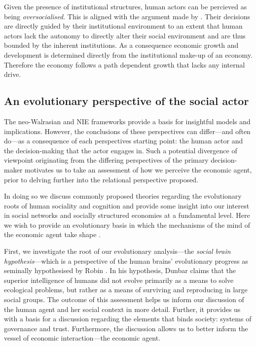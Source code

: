 

Given the presence of institutional structures, human actors can be percieved as being \emph{oversocialised}. This is aligned with the argument made by \cite{Grannovetter1985}. Their decisions are directly guided by their institutional environment to an extent that human actors lack the autonomy to directly alter their social environment and are thus bounded by the inherent institutions. As a consequence economic growth and development is determined directly from the institutional make-up of an economy. Therefore the economy follows a path dependent growth that lacks any internal drive.

\subsection{An evolutionary perspective of the social actor}

The neo-Walrasian and NIE frameworks provide a basis for insightful models and implications. However, the conclusions of these perspectives can differ---and often do---as a consequence of each perspectives starting point: the human actor and the decision-making that the actor engages in. Such a potential divergence of viewpoint originating from the differing perspectives of the primary decision-maker motivates us to take an assessment of how we perceive the economic agent, prior to delving further into the relational perspective proposed.

In doing so we discuss commonly proposed theories regarding the evolutionary roots of human sociality and cognition and provide some insight into our interest in social networks and socially structured economies at a fundamental level. Here we wish to provide an evolutionary basis in which the mechanisms of the mind of the economic agent take shape \citep{Pinker1997}. 

First, we investigate the root of our evolutionary analysis---the \emph{social brain hypothesis}---which is a perspective of the human brains' evolutionary progress as seminally hypothesised by Robin \citet{Dunbar1998}. In his hypothesis, Dunbar claims that the superior intelligence of humans did not evolve primarily as a means to solve ecological problems, but rather as a means of surviving and reproducing in large social groups. The outcome of this assessment helps us inform our discussion of the human agent and her social context in more detail. Further, it provides us with a basis for a discussion regarding the elements that binds society: systems of governance and trust. Furthermore, the discussion allows us to better inform the vessel of economic interaction---the economic agent.

